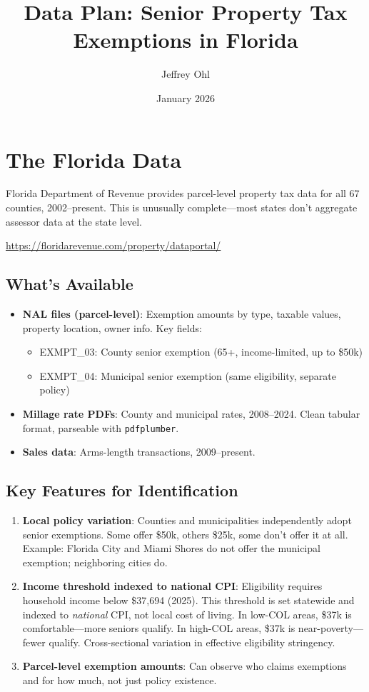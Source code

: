 \documentclass[11pt]{article}
\title{Data Plan: Senior Property Tax Exemptions in Florida}
\author{Jeffrey Ohl}
\date{January 2026}
\begin{document}
\maketitle

\section{The Florida Data}

Florida Department of Revenue provides parcel-level property tax data for all 67 counties, 2002--present. This is unusually complete---most states don't aggregate assessor data at the state level.

\url{https://floridarevenue.com/property/dataportal/}

\subsection{What's Available}

\begin{itemize}
    \item \textbf{NAL files (parcel-level)}: Exemption amounts by type, taxable values, property location, owner info. Key fields:
    \begin{itemize}
        \item EXMPT\_03: County senior exemption (65+, income-limited, up to \$50k)
        \item EXMPT\_04: Municipal senior exemption (same eligibility, separate policy)
    \end{itemize}
    \item \textbf{Millage rate PDFs}: County and municipal rates, 2008--2024. Clean tabular format, parseable with \texttt{pdfplumber}.
    \item \textbf{Sales data}: Arms-length transactions, 2009--present.
\end{itemize}

\subsection{Key Features for Identification}

\begin{enumerate}
    \item \textbf{Local policy variation}: Counties and municipalities independently adopt senior exemptions. Some offer \$50k, others \$25k, some don't offer it at all. Example: Florida City and Miami Shores do not offer the municipal exemption; neighboring cities do.

    \item \textbf{Income threshold indexed to national CPI}: Eligibility requires household income below \$37,694 (2025). This threshold is set statewide and indexed to \textit{national} CPI, not local cost of living. In low-COL areas, \$37k is comfortable---more seniors qualify. In high-COL areas, \$37k is near-poverty---fewer qualify. Cross-sectional variation in effective eligibility stringency.

    \item \textbf{Parcel-level exemption amounts}: Can observe who claims exemptions and for how much, not just policy existence.
\end{enumerate}
\end{document}
